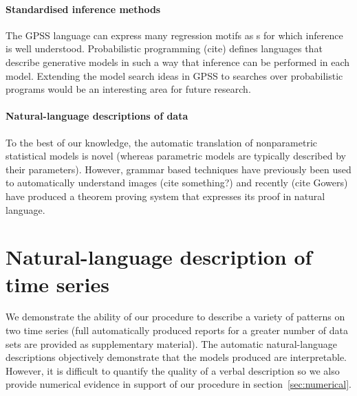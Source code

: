 \documentclass{article}
\begin{document}
\paragraph{Standardised inference methods}

The GPSS language can express many regression motifs as \gp{}s for which inference is well understood.
Probabilistic programming (cite) defines languages that describe generative models in such a way that inference can be performed in each model.
Extending the model search ideas in GPSS to searches over probabilistic programs would be an interesting area for future research.

\paragraph{Natural-language descriptions of data}

To the best of our knowledge, the automatic translation of nonparametric statistical models is novel (whereas parametric models are typically described by their parameters).
However, grammar based techniques have previously been used to automatically understand images (cite something?) and recently (cite Gowers) have produced a theorem proving system that expresses its proof in natural language.

\section{Natural-language description of time series}
\label{sec:examples}

We demonstrate the ability of our procedure to describe a variety of patterns on two time series (full automatically produced reports for a greater number of data sets are provided as supplementary material).
The automatic natural-language descriptions objectively demonstrate that the models produced are interpretable.
However, it is difficult to quantify the quality of a verbal description so we also provide numerical evidence in support of our procedure in section~\ref{sec:numerical}.
\end{document}
